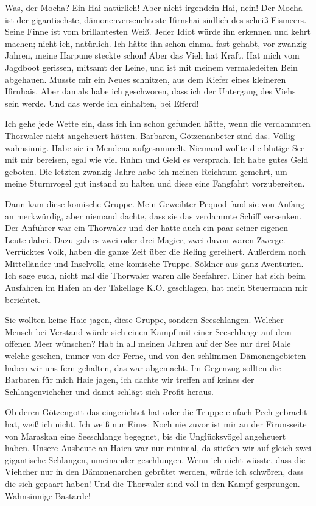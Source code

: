 \documentclass[final]{multiversum}
\begin{document}
Was, der Mocha?
Ein Hai natürlich!
Aber nicht irgendein Hai, nein!
Der Mocha ist der gigantischste, dämonenverseuchteste Ifirnshai südlich des scheiß Eismeers.
Seine Finne ist vom brillantesten Weiß.
Jeder Idiot würde ihn erkennen und kehrt machen; nicht ich, natürlich.
Ich hätte ihn schon einmal fast gehabt, vor zwanzig Jahren, meine Harpune steckte schon!
Aber das Vieh hat Kraft. 
Hat mich vom Jagdboot gerissen, mitsamt der Leine, und ist mit meinem vermaledeiten Bein abgehauen.
Musste mir ein Neues schnitzen, aus dem Kiefer eines kleineren Ifirnhais.
Aber damals habe ich geschworen, dass ich der Untergang des Viehs sein werde.
Und das werde ich einhalten, bei Efferd!

Ich gehe jede Wette ein, dass ich ihn schon gefunden hätte, wenn die verdammten Thorwaler nicht angeheuert hätten.
Barbaren, Götzenanbeter sind das.
Völlig wahnsinnig.
Habe sie in Mendena aufgesammelt.
Niemand wollte die blutige See mit mir bereisen, egal wie viel Ruhm und Geld es versprach.
Ich habe gutes Geld geboten. 
Die letzten zwanzig Jahre habe ich meinen Reichtum gemehrt, um meine Sturmvogel gut instand zu halten und diese eine Fangfahrt vorzubereiten.

Dann kam diese komische Gruppe.
Mein Geweihter Pequod fand sie von Anfang an merkwürdig, aber niemand dachte, dass sie das verdammte Schiff versenken.
Der Anführer war ein Thorwaler und der hatte auch ein paar seiner eigenen Leute dabei.
Dazu gab es zwei oder drei Magier, zwei davon waren Zwerge.
Verrücktes Volk, haben die ganze Zeit über die Reling gereihert.
Außerdem noch Mittelländer und Inselvolk, eine komische Truppe.
Söldner aus ganz Aventurien.
Ich sage euch, nicht mal die Thorwaler waren alle Seefahrer.
Einer hat sich beim Ausfahren im Hafen an der Takellage K.O. geschlagen, hat mein Steuermann mir berichtet.

Sie wollten keine Haie jagen, diese Gruppe, sondern Seeschlangen.
Welcher Mensch bei Verstand würde sich einen Kampf mit einer Seeschlange auf dem offenen Meer wünschen?
Hab in all meinen Jahren auf der See nur drei Male welche gesehen, immer von der Ferne, und von den schlimmen Dämonengebieten haben wir uns fern gehalten, das war abgemacht.
Im Gegenzug sollten die Barbaren für mich Haie jagen, ich dachte wir treffen auf keines der Schlangenviehcher und damit schlägt sich Profit heraus.

Ob deren Götzengott das eingerichtet hat oder die Truppe einfach Pech gebracht hat, weiß ich nicht.
Ich weiß nur Eines:
Noch nie zuvor ist mir an der Firunsseite von Maraskan eine Seeschlange begegnet, bis die Unglücksvögel angeheuert haben.
Unsere Ausbeute an Haien war nur minimal, da stießen wir auf gleich zwei gigantische Schlangen, umeinander geschlungen.
Wenn ich nicht wüsste, dass die Viehcher nur in den Dämonenarchen gebrütet werden, würde ich schwören, dass die sich gepaart haben!
Und die Thorwaler sind voll in den Kampf gesprungen.
Wahnsinnige Bastarde!
\end{document}
